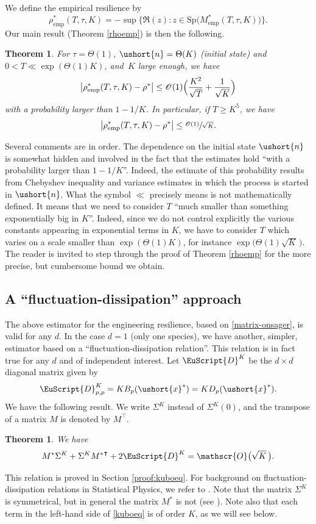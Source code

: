 \documentclass[10pt]{amsart}
\newcommand{\emp}{\mathrm{emp}}
\let\mathcal\mathscr
\numberwithin{equation}{section}
\theoremstyle{plain}
\newtheorem{theorem}{Theorem}[section]
\newtheorem*{theorem*}{Theorem}
\theoremstyle{definition}
\newcommand{\Oun}{\mathcal{O}(1)}
\newcommand{\Thetaun}{\Theta(1)}
\newcommand{\sK}{K}
\newcommand{\Sp}{\mathrm{Sp}}
\newcommand{\vecn}{\ushort{n}}
\newcommand{\vecxf}{\ushort{x}^*}
\newcommand{\res}{\rho^*}
\begin{document}
We define the empirical resilience by
\[
\rho^*_\emp(T,\tau,K)=
- \sup\big\{ \Re (z): z\in\Sp\bigl(M^{*}_\emp(T,\tau,K)\bigr)\big\}.
\]
Our main result (Theorem \ref{rhoemp}) is then the following.
\begin{theorem*}
For $\tau=\Theta(1)$, $\vecn=\Theta(K)$ (initial state) and $0<T\ll \exp(\Thetaun K)$,
and~$K$ large enough, we have
\[
\big|\rho^*_\emp(T,\tau,K)-\res\big|\le
\Oun \Bigl(\frac{K^2}{\sqrt{T}} +\frac{1}{\sqrt{K}}\Bigr)
\]
with a probability larger than $1-1/K$. In particular, if $T\geq K^5$, we have
\[
\big|\rho^*_\emp(T,\tau,K)-\res\big|\leq \sfrac{\Oun}{\sqrt{K}}.
\]
\end{theorem*}
Several comments are in order.
The dependence on the initial state $\vecn$ is somewhat hidden and involved in the fact that the estimates hold ``with a probability larger than $1-1/K$''.
Indeed, the estimate of this probability results from Chebyshev inequality and variance estimates in which the process is started in
$\vecn$.
What the symbol $\ll$ precisely means is not mathematically defined. It means that we need to consider $T$ ``much smaller than
something exponentially big in $K$''. Indeed, since we do not control explicitly the various constants appearing in exponential terms in $K$, we have to
consider $T$ which varies on a scale smaller than $\exp(\Theta(1)K)$, for instance $\exp\bigl(\Theta(1)\sqrt{K}\,\bigr)$. The
reader is invited to step through the proof of Theorem \ref{rhoemp} for the more precise, but cumbersome bound we obtain.

\subsection{A ``fluctuation-dissipation'' approach}

The above estimator for the engineering resilience, based on \eqref{matrix-onsager}, is valid for any $d$.
In the case $d=1$ (only one species), we have another, simpler, estimator based on a ``fluctuation-dissipation relation''.
This relation is in fact true for any $d$ and of independent interest.
Let $\EuScript{D}^{\sK}$ be the $d\times d$ diagonal matrix given by
\[
\EuScript{D}^{\sK}_{p,p}=K B_{p}(\vecxf)=K D_{p}(\vecxf).
\]
We have the following result. We write $\Sigma^{\sK}$ instead of $\Sigma^{\sK}(0)$, and the transpose of a matrix $M$ is denoted
by $M^{\intercal}$.
\begin{theorem}\label{thm-Kubo}
We have
\begin{equation}\label{kuboeq}
M^*\Sigma^{\sK}+\Sigma^{\sK}{M^*}^{\intercal}+2\EuScript{D}^{\sK}=\mathcal{O}\bigl(\sqrt{K}\,\bigr).
\end{equation}
\end{theorem}
This relation is proved in Section \ref{proof:kuboeq}. For background on fluctuation-dissipation relations in Statistical
Physics, we refer to \cite[\S\S 2-3]{kubo}. Note that the matrix $\Sigma^{\sK}$ is symmetrical, but in general the matrix
$M^*$ is not (see
\cite{ccm2}). Note also that each term in the left-hand side of \eqref{kuboeq} is of order $K$, as we will see below.
\end{document}
